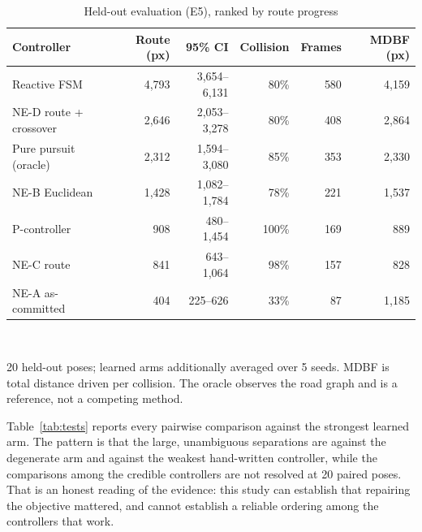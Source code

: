 \documentclass[conference]{IEEEtran}
\begin{document}
\begin{table}[!t]
\caption{Held-out evaluation (E5), ranked by route progress}
\label{tab:final}
\centering
\footnotesize
\begin{tabular}{lrrrrr}
\toprule
Controller & Route (px) & 95\% CI & Collision & Frames & MDBF (px) \\
\midrule
Reactive FSM & 4,793 & 3,654–6,131 & 80\% & 580 & 4,159 \\
NE-D route + crossover & 2,646 & 2,053–3,278 & 80\% & 408 & 2,864 \\
Pure pursuit (oracle) & 2,312 & 1,594–3,080 & 85\% & 353 & 2,330 \\
NE-B Euclidean & 1,428 & 1,082–1,784 & 78\% & 221 & 1,537 \\
P-controller & 908 & 480–1,454 & 100\% & 169 & 889 \\
NE-C route & 841 & 643–1,064 & 98\% & 157 & 828 \\
NE-A as-committed & 404 & 225–626 & 33\% & 87 & 1,185 \\
\bottomrule
\end{tabular}
\\[2pt]\parbox{\linewidth}{\scriptsize 20 held-out poses; learned arms additionally averaged over 5 seeds. MDBF is total distance driven per collision. The oracle observes the road graph and is a reference, not a competing method.}
\end{table}

Table~\ref{tab:tests} reports every pairwise comparison against the strongest learned arm. The pattern is that the large, unambiguous separations are against the degenerate arm and against the weakest hand-written controller, while the comparisons among the credible controllers are not resolved at 20 paired poses. That is an honest reading of the evidence: this study can establish that repairing the objective mattered, and cannot establish a reliable ordering among the controllers that work.
\end{document}
